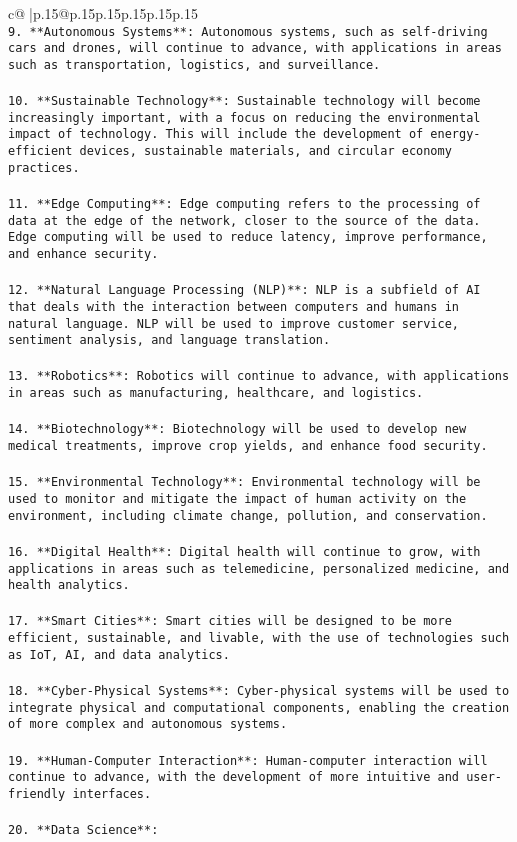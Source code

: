 \documentclass{article}
\begin{document}
{\begin{supertabular}{c@{$\;$}|p{.15\linewidth}@{}p{.15\linewidth}p{.15\linewidth}p{.15\linewidth}p{.15\linewidth}p{.15\linewidth}}
{{{\tt \\ \tt 9. **Autonomous Systems**: Autonomous systems, such as self-driving cars and drones, will continue to advance, with applications in areas such as transportation, logistics, and surveillance.\\ \tt \\ \tt 10. **Sustainable Technology**: Sustainable technology will become increasingly important, with a focus on reducing the environmental impact of technology. This will include the development of energy-efficient devices, sustainable materials, and circular economy practices.\\ \tt \\ \tt 11. **Edge Computing**: Edge computing refers to the processing of data at the edge of the network, closer to the source of the data. Edge computing will be used to reduce latency, improve performance, and enhance security.\\ \tt \\ \tt 12. **Natural Language Processing (NLP)**: NLP is a subfield of AI that deals with the interaction between computers and humans in natural language. NLP will be used to improve customer service, sentiment analysis, and language translation.\\ \tt \\ \tt 13. **Robotics**: Robotics will continue to advance, with applications in areas such as manufacturing, healthcare, and logistics.\\ \tt \\ \tt 14. **Biotechnology**: Biotechnology will be used to develop new medical treatments, improve crop yields, and enhance food security.\\ \tt \\ \tt 15. **Environmental Technology**: Environmental technology will be used to monitor and mitigate the impact of human activity on the environment, including climate change, pollution, and conservation.\\ \tt \\ \tt 16. **Digital Health**: Digital health will continue to grow, with applications in areas such as telemedicine, personalized medicine, and health analytics.\\ \tt \\ \tt 17. **Smart Cities**: Smart cities will be designed to be more efficient, sustainable, and livable, with the use of technologies such as IoT, AI, and data analytics.\\ \tt \\ \tt 18. **Cyber-Physical Systems**: Cyber-physical systems will be used to integrate physical and computational components, enabling the creation of more complex and autonomous systems.\\ \tt \\ \tt 19. **Human-Computer Interaction**: Human-computer interaction will continue to advance, with the development of more intuitive and user-friendly interfaces.\\ \tt \\ \tt 20. **Data Science**: }}}
\end{supertabular}}
\end{document}
